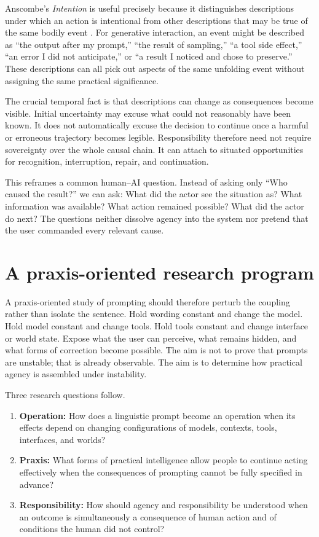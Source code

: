 \documentclass[11pt]{article}
\begin{document}
Anscombe's \emph{Intention} is useful precisely because it distinguishes descriptions under which an action is intentional from other descriptions that may be true of the same bodily event \citep{anscombe1957}. For generative interaction, an event might be described as ``the output after my prompt,'' ``the result of sampling,'' ``a tool side effect,'' ``an error I did not anticipate,'' or ``a result I noticed and chose to preserve.'' These descriptions can all pick out aspects of the same unfolding event without assigning the same practical significance.

The crucial temporal fact is that descriptions can change as consequences become visible. Initial uncertainty may excuse what could not reasonably have been known. It does not automatically excuse the decision to continue once a harmful or erroneous trajectory becomes legible. Responsibility therefore need not require sovereignty over the whole causal chain. It can attach to situated opportunities for recognition, interruption, repair, and continuation.

This reframes a common human--AI question. Instead of asking only ``Who caused the result?'' we can ask: What did the actor see the situation as? What information was available? What action remained possible? What did the actor do next? The questions neither dissolve agency into the system nor pretend that the user commanded every relevant cause.

\section{A praxis-oriented research program}
A praxis-oriented study of prompting should therefore perturb the coupling rather than isolate the sentence. Hold wording constant and change the model. Hold model constant and change tools. Hold tools constant and change interface or world state. Expose what the user can perceive, what remains hidden, and what forms of correction become possible. The aim is not to prove that prompts are unstable; that is already observable. The aim is to determine how practical agency is assembled under instability.

Three research questions follow.

\begin{enumerate}[leftmargin=*]
\item \textbf{Operation:} How does a linguistic prompt become an operation when its effects depend on changing configurations of models, contexts, tools, interfaces, and worlds?
\item \textbf{Praxis:} What forms of practical intelligence allow people to continue acting effectively when the consequences of prompting cannot be fully specified in advance?
\item \textbf{Responsibility:} How should agency and responsibility be understood when an outcome is simultaneously a consequence of human action and of conditions the human did not control?
\end{enumerate}
\end{document}
